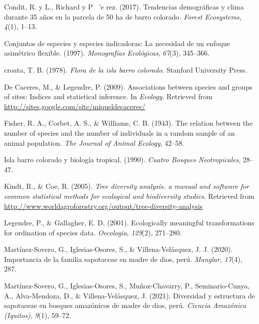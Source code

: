 \documentclass[11pt,]{article}
\begin{document}
\hypertarget{ref-condit2017demographic}{}
Condit, R. y L., Richard y P ~'e rez. (2017). Tendencias demográficas y
clima durante 35 años en la parcela de 50 ha de barro colorado.
\emph{Forest Ecosystems}, \emph{4}(1), 1--13.

\hypertarget{ref-dufrene1997species}{}
Conjuntos de especies y especies indicadoras: La necesidad de un enfoque
asimétrico flexible. (1997). \emph{Monografías Ecológicas},
\emph{67}(3), 345--366.

\hypertarget{ref-croat1978flora}{}
croata, T. B. (1978). \emph{Flora de la isla barro colorado}. Stanford
University Press.

\hypertarget{ref-indicspecies}{}
De Caceres, M., \& Legendre, P. (2009). Associations between species and
groups of sites: Indices and statistical inference. In \emph{Ecology}.
Retrieved from \url{http://sites.google.com/site/miqueldecaceres/}

\hypertarget{ref-fisher1943relation}{}
Fisher, R. A., Corbet, A. S., \& Williams, C. B. (1943). The relation
between the number of species and the number of individuals in a random
sample of an animal population. \emph{The Journal of Animal Ecology},
42--58.

\hypertarget{ref-leigh1990barro}{}
Isla barro colorado y biología tropical. (1990). \emph{Cuatro Bosques
Neotropicales}, 28--47.

\hypertarget{ref-diversityanalysis}{}
Kindt, R., \& Coe, R. (2005). \emph{Tree diversity analysis. a manual
and software for common statistical methods for ecological and
biodiversity studies}. Retrieved from
\url{http://www.worldagroforestry.org/output/tree-diversity-analysis}

\hypertarget{ref-legendre2001ecologically}{}
Legendre, P., \& Gallagher, E. D. (2001). Ecologically meaningful
transformations for ordination of species data. \emph{Oecologia},
\emph{129}(2), 271--280.

\hypertarget{ref-martinez2020importancia}{}
Martínez-Sovero, G., Iglesias-Osores, S., \& Villena-Velásquez, J. J.
(2020). Importancia de la familia sapotaceae en madre de dios, perú.
\emph{Manglar}, \emph{17}(4), 287.

\hypertarget{ref-martinez2021diversidad}{}
Martínez-Sovero, G., Iglesias-Osores, S., Muñoz-Chavarry, P.,
Seminario-Cunya, A., Alva-Mendoza, D., \& Villena-Velásquez, J. (2021).
Diversidad y estructura de sapotaceae en bosques amazónicos de madre de
dios, perú. \emph{Ciencia Amazónica (Iquitos)}, \emph{9}(1), 59--72.
\end{document}
